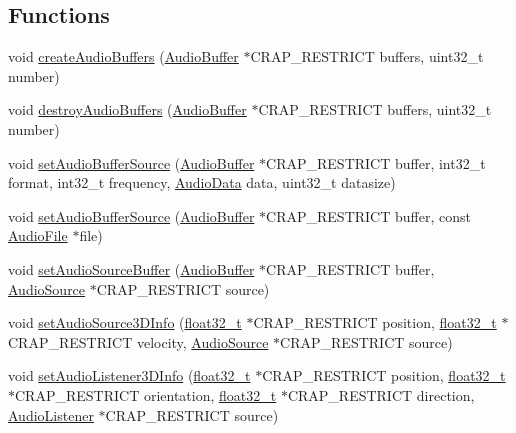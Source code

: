 \subsection*{Functions}
\begin{DoxyCompactItemize}
\item 
void \hyperlink{namespacecrap_a75adbab08e3e93e93cc24530cc0b3857}{create\+Audio\+Buffers} (\hyperlink{namespacecrap_a90f6b78604f0bc004080819aa4691107}{Audio\+Buffer} $\ast$C\+R\+A\+P\+\_\+\+R\+E\+S\+T\+R\+I\+C\+T buffers, uint32\+\_\+t number)
\item 
void \hyperlink{namespacecrap_a7aa749722243092c448eb1c1b669b843}{destroy\+Audio\+Buffers} (\hyperlink{namespacecrap_a90f6b78604f0bc004080819aa4691107}{Audio\+Buffer} $\ast$C\+R\+A\+P\+\_\+\+R\+E\+S\+T\+R\+I\+C\+T buffers, uint32\+\_\+t number)
\item 
void \hyperlink{namespacecrap_a85dc73e4d490758aac7e9d648d393cbc}{set\+Audio\+Buffer\+Source} (\hyperlink{namespacecrap_a90f6b78604f0bc004080819aa4691107}{Audio\+Buffer} $\ast$C\+R\+A\+P\+\_\+\+R\+E\+S\+T\+R\+I\+C\+T buffer, int32\+\_\+t format, int32\+\_\+t frequency, \hyperlink{namespacecrap_a0566c0c5049ce39b01856c01d2669f2c}{Audio\+Data} data, uint32\+\_\+t datasize)
\item 
void \hyperlink{namespacecrap_ae9302b30bef03e7f28a03cdb940692c9}{set\+Audio\+Buffer\+Source} (\hyperlink{namespacecrap_a90f6b78604f0bc004080819aa4691107}{Audio\+Buffer} $\ast$C\+R\+A\+P\+\_\+\+R\+E\+S\+T\+R\+I\+C\+T buffer, const \hyperlink{structcrap_1_1_audio_file}{Audio\+File} $\ast$file)
\item 
void \hyperlink{namespacecrap_a9de56176bc85e51fe6cdd5ef7f356941}{set\+Audio\+Source\+Buffer} (\hyperlink{namespacecrap_a90f6b78604f0bc004080819aa4691107}{Audio\+Buffer} $\ast$C\+R\+A\+P\+\_\+\+R\+E\+S\+T\+R\+I\+C\+T buffer, \hyperlink{namespacecrap_a462d678db37c6a434145136ab6d59720}{Audio\+Source} $\ast$C\+R\+A\+P\+\_\+\+R\+E\+S\+T\+R\+I\+C\+T source)
\item 
void \hyperlink{namespacecrap_add874e22ffee42dd9182b4a86edbfe03}{set\+Audio\+Source3\+D\+Info} (\hyperlink{crap__types_8h_a4611b605e45ab401f02cab15c5e38715}{float32\+\_\+t} $\ast$C\+R\+A\+P\+\_\+\+R\+E\+S\+T\+R\+I\+C\+T position, \hyperlink{crap__types_8h_a4611b605e45ab401f02cab15c5e38715}{float32\+\_\+t} $\ast$C\+R\+A\+P\+\_\+\+R\+E\+S\+T\+R\+I\+C\+T velocity, \hyperlink{namespacecrap_a462d678db37c6a434145136ab6d59720}{Audio\+Source} $\ast$C\+R\+A\+P\+\_\+\+R\+E\+S\+T\+R\+I\+C\+T source)
\item 
void \hyperlink{namespacecrap_a19612e9cf4d854eb89a5bd071f072915}{set\+Audio\+Listener3\+D\+Info} (\hyperlink{crap__types_8h_a4611b605e45ab401f02cab15c5e38715}{float32\+\_\+t} $\ast$C\+R\+A\+P\+\_\+\+R\+E\+S\+T\+R\+I\+C\+T position, \hyperlink{crap__types_8h_a4611b605e45ab401f02cab15c5e38715}{float32\+\_\+t} $\ast$C\+R\+A\+P\+\_\+\+R\+E\+S\+T\+R\+I\+C\+T orientation, \hyperlink{crap__types_8h_a4611b605e45ab401f02cab15c5e38715}{float32\+\_\+t} $\ast$C\+R\+A\+P\+\_\+\+R\+E\+S\+T\+R\+I\+C\+T direction, \hyperlink{namespacecrap_a73b9ecbfa0198e8a702c3569958e1653}{Audio\+Listener} $\ast$C\+R\+A\+P\+\_\+\+R\+E\+S\+T\+R\+I\+C\+T source)

\end{DoxyCompactItemize}
